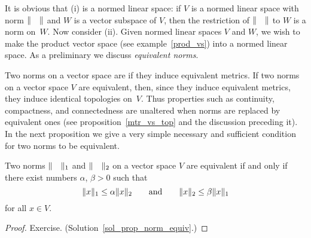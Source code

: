 It is obvious that (i) is a normed linear space: if $V$ is a normed linear space with norm
$\lVert\quad\rVert$ and $W$ is a vector subspace of $V$, then the restriction of $\lVert\quad\rVert$ to $W$
is a norm on~$W$. Now consider (ii).  Given normed linear spaces $V$ and $W$, we wish to make
the product vector space (see example~\ref{prod_vs}) into a normed linear space.  As a
preliminary we discuss \emph{equivalent norms}.

\begin{defn}  Two norms on a vector space are
 if they induce equivalent metrics.  If two norms on a vector space $V$ are
equivalent, then, since they induce equivalent metrics, they induce identical topologies
on~$V$.  Thus properties such as continuity, compactness, and connectedness are unaltered when
norms are replaced by equivalent ones (see proposition~\ref{mtr_vs_top} and the discussion
preceding it).  In the next proposition we give a very simple necessary and sufficient
condition for two norms to be equivalent.
\end{defn}

\begin{prop}\label{prop_norm_equiv}  Two norms $\lVert\quad\rVert_1$ and $\lVert\quad\rVert_2$ on a vector
space $V$ are equivalent if and only if there exist numbers $\alpha$, $\beta > 0$ such that
  \[ \lVert x\rVert_1 \le \alpha \lVert x\rVert_2 \qquad\text{and}\qquad \lVert x\rVert_2 \le \beta \lVert x\rVert_1 \]
for all $x \in V$.
\end{prop}

\begin{proof}  Exercise. (Solution~\ref{sol_prop_norm_equiv}.)  \ns  \end{proof}

